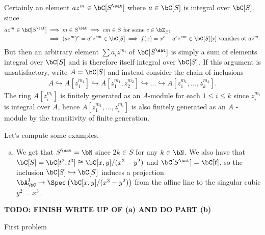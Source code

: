 \begin{homework}[e]
\begin{prf}
		Certainly an element $a z^m \in \bC[S^{\sat}]$ where $a \in \bC[S]$ is integral over $\bC[S]$, since
		\begin{align*}
			az^m \in \bC[S^{\sat}] &\implies m \in S^{\sat} \implies cm \in S \text{ for some } c \in \bZ_{\geq 1} \\
			&\implies (az^m)^c = a^cz^{cm} \in \bC[S] \implies f(x) = x^c - a^cz^{cm} \in \bC[S][x] \text{ vanishes at } az^m.
		\end{align*}
		But then an arbitrary element $\sum a_i z^{m_i}$ of $\bC[S^{\sat}]$ is simply a sum of elements integral over $\bC[S]$ and is therefore itself integral over $\bC[S]$. If this argument is unsatisfactory, write $A = \bC[S]$ and instead consider the chain of inclusions
		\begin{align*}
			A \hookrightarrow A\left[z_1^{m_1}\right] \hookrightarrow A\left[z_1^{m_1},z_2^{m_2}\right] \hookrightarrow ... \hookrightarrow A\left[z_1^{m_1},...,z_k^{m_k}\right].
		\end{align*}
		The ring $A[z_i^{m_i}]$ is finitely generated as an $A$-module for each $1\leq i\leq k$ since $z_i^{m_i}$ is integral over $A$, hence $A[z_1^{m_1},...,z_i^{m_i}]$ is also finitely generated as an $A$ -module by the transitivity of finite generation.
        
		Let's compute some examples.
		\begin{enumerate}[(a)]
			\item We get that $S^{\sat} = \bN$ since $2k \in S$ for any $k \in \bN$. We also have that $\bC[S] = \bC[t^2,t^3] \cong \bC[x,y]/(x^3-y^2)$ and $\bC[S^{\sat} ] = \bC[t]$, so the inclusion $\bC[S] \hookrightarrow \bC[S^{}]$ induces a projection  $\bA^1_\bC \to \Spec \left(\bC[x,y]/(x^3-y^2)\right)$ from the affine line to the singular cubic $y^2 = x^3$. 
		\end{enumerate}
        \textbf{TODO: FINISH WRITE UP OF (a) AND DO PART (b)} 
	\end{prf}
\end{homework}
	
\begin{homework}[e]
	\prob First problem
\end{homework}

